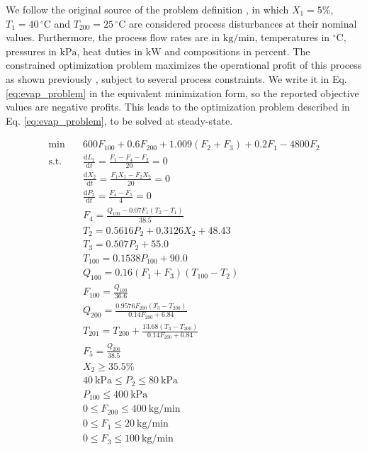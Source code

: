 \documentclass{achemso}
\begin{document}
We follow the original source of the problem definition \cite{kariwala07}, in which $X_1 = 5\%$, $T_1 = 40\,^\circ\mathrm{C}$ and $T_{200} = 25\,^\circ\mathrm{C}$ are considered process disturbances at their nominal values. Furthermore, the process flow rates are in $\mathrm{kg/min}$, temperatures in $^\circ\mathrm{C}$, pressures in $\mathrm{kPa}$, heat duties in $\mathrm{kW}$ and compositions in percent. The constrained optimization problem maximizes the operational profit of this process as shown previously \cite{kariwala07}, subject to several process constraints. We write it in Eq. \ref{eq:evap_problem} in the equivalent minimization form, so the reported objective values are negative profits. This leads to the optimization problem described in Eq. \ref{eq:evap_problem}, to be solved at steady-state.

\begin{subequations}\label{eq:evap_problem}
\begin{align}
\min \quad 
& 600F_{100} + 0.6F_{200} + 1.009\left(F_2+F_3\right) + 0.2F_1 - 4800F_2
\label{eq:opt_obj}\\[4pt]
\text{s.t.}\quad 
& \frac{\mathrm{d}L_2}{\mathrm{d}t}=\frac{F_1-F_4-F_2}{20} = 0
\label{eq:opt_L2}\\
& \frac{\mathrm{d}X_2}{\mathrm{d}t}=\frac{F_1X_1-F_2X_2}{20} = 0
\label{eq:opt_X2}\\
& \frac{\mathrm{d}P_2}{\mathrm{d}t}=\frac{F_4-F_5}{4} = 0
\label{eq:opt_P2}\\
& F_4=\frac{Q_{100}-0.07F_1\left(T_2-T_1\right)}{38.5}
\label{eq:opt_F4}\\[2pt]
& T_2=0.5616P_2+0.3126X_2+48.43
\label{eq:opt_T2}\\
& T_3=0.507P_2+55.0
\label{eq:opt_T3}\\
& T_{100}=0.1538P_{100}+90.0
\label{eq:opt_T100}\\
& Q_{100}=0.16\left(F_1+F_3\right)\left(T_{100}-T_2\right)
\label{eq:opt_Q100}\\
& F_{100}=\frac{Q_{100}}{36.6}
\label{eq:opt_F100}\\
& Q_{200}=\frac{0.9576F_{200}\left(T_3-T_{200}\right)}{0.14F_{200}+6.84}
\label{eq:opt_Q200}\\
& T_{201}=T_{200}+\frac{13.68\left(T_3-T_{200}\right)}{0.14F_{200}+6.84}
\label{eq:opt_T201}\\
& F_5=\frac{Q_{200}}{38.5}
\label{eq:opt_F5}\\[4pt]
& X_2 \ge 35.5\%
\label{eq:opt_X2min}\\
& 40~\mathrm{kPa}\le P_2 \le 80~\mathrm{kPa}
\label{eq:opt_P2bounds}\\
& P_{100}\le 400~\mathrm{kPa}
\label{eq:opt_P100bound}\\
& 0 \le F_{200}\le 400~\mathrm{kg/min}
\label{eq:opt_F200bounds}\\
& 0 \le F_1\le 20~\mathrm{kg/min}
\label{eq:opt_F1bounds}\\
& 0 \le F_3\le 100~\mathrm{kg/min}
\label{eq:opt_F3bounds}
\end{align}
\end{subequations}
\end{document}
